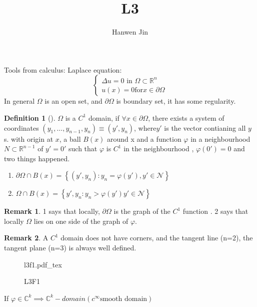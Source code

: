 \documentclass[a4paper]{article}
\title{L3}
\author{Hanwen Jin}
\newcommand{\incfig}[1]{%
	\def\svgwidth{\columnwidth}
	{#1.pdf_tex}
}
\theoremstyle{definition}
\newtheorem{definition}{Definition}[section]
\newtheorem*{remark}{Remark}
\begin{document}
	\maketitle
	Tools from calculus:
	Laplace equation: 
	\begin{equation}
		\begin{cases}
			\Delta u=0 \text{ in }\Omega \subset \mathbb{R}^{n}\\
			u\left( x \right) =0 \text{for} x\in \partial\Omega
		\end{cases}
	\end{equation} 
	In general $\Omega$ is an open set, and $\partial \Omega$ is boundary set, it has some regularity. 

	\begin{definition}[]
		$\Omega$ is a $C^{1} $ domain, if $\forall  x\in \partial \Omega$, there exists a system of coordinates $\left( y_1,\ldots,y_{n-1},y_{n} \right) \equiv\left( y',y_{n} \right) $, where$y'$ is the vector contianing all $y$s. with origin at $x$, a ball $B\left( x \right) $ around x and a function $\varphi$ in a neighbourhood $N\subset \mathbb{R}^{n-1}$ of $y'=0'$ such that $\varphi$ is $C^{1} $ in the neighbourhood , $\varphi\left( 0' \right) =0$ and two things happened. 
	\end{definition}
	\begin{enumerate}
		\item $\partial\Omega \cap B\left( x \right) =\left\{ \left( y',y_{n} \right) :y_{n}=\varphi\left( y' \right) ,y'\in \mathcal{N} \right\} $
		\item $\Omega \cap B\left( x \right) =\left\{ y',y_{n}:y_n>\varphi\left( y' \right) y'\in \mathcal{N} \right\} $
	\end{enumerate}
	\begin{remark}
		1 says that locally, $\partial \Omega$ is the graph of the $C^{1}$ function . 2 says that locally $\Omega$ lies on one side of the graph of $\varphi$. 
	\end{remark}
	\begin{remark}
		A $C^{1}$ domain does not have corners, and the tangent line (n=2), the tangent plane (n=3) is always well defined. 
	\end{remark}
\begin{figure}[H]
    \centering
    \incfig{l3f1}
    \caption{L3F1}
    \label{fig:l3f1}
\end{figure}
If $\varphi \in \mathbb{C}^{k} \implies \mathbb{C}^{k} -domain\left( c^{\infty} \text{smooth domain} \right) $
\end{document}
